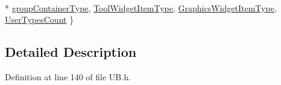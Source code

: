 \begin{DoxyCompactItemize}
\\*
\hyperlink{struct_u_b_graphics_item_type_a1892bf6b1fe9cb0275002ca8648bee28a21415a6f105be70102129f61bd0621fe}{group\-Container\-Type}, 
\hyperlink{struct_u_b_graphics_item_type_a1892bf6b1fe9cb0275002ca8648bee28ae6b9229b38e91654e6904ab3b5cf11ca}{Tool\-Widget\-Item\-Type}, 
\hyperlink{struct_u_b_graphics_item_type_a1892bf6b1fe9cb0275002ca8648bee28a06cb0a0df8c8610c434b59c78b157812}{Graphics\-Widget\-Item\-Type}, 
\hyperlink{struct_u_b_graphics_item_type_a1892bf6b1fe9cb0275002ca8648bee28a4ce80b4ee994e44eefc4a28acfe12587}{User\-Types\-Count}
 \}
\end{DoxyCompactItemize}


\subsection{Detailed Description}


Definition at line 140 of file U\-B.\-h.



